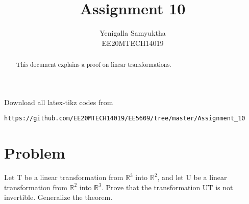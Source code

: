 \documentclass[journal,12pt,twocolumn]{IEEEtran}
\numberwithin{table}{section}
\begin{document}
     \def\rightbox#1{\makebox[0in][r]{#1}}
     \def\centbox#1{\makebox[0in]{#1}}
     \def\topbox#1{\raisebox{-\baselineskip}[0in][0in]{#1}}
     \def\midbox#1{\raisebox{-0.5\baselineskip}[0in][0in]{#1}}
\vspace{3cm}
\title{Assignment 10}
\author{Yenigalla Samyuktha\\EE20MTECH14019}
\maketitle
\newpage
\bigskip
\renewcommand{\thefigure}{\theenumi}
\renewcommand{\thetable}{1}
\begin{abstract}
This document explains a proof on linear transformations.
\end{abstract}
Download all latex-tikz codes from 
%
\begin{lstlisting}
https://github.com/EE20MTECH14019/EE5609/tree/master/Assignment_10
\end{lstlisting}
%
\section{Problem}
Let T be a linear transformation from $\mathbb{R}^3$ into $\mathbb{R}^2$, and let U be a linear transformation from $\mathbb{R}^2$ into $\mathbb{R}^3$. Prove that the transformation UT is not invertible. Generalize the theorem.
\end{document}
